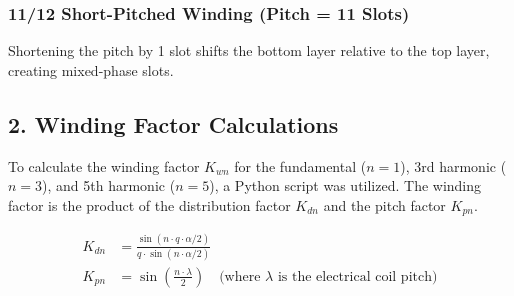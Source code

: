 \documentclass{article}
\begin{document}
\subsubsection*{11/12 Short-Pitched Winding (Pitch = 11 Slots)}
Shortening the pitch by 1 slot shifts the bottom layer relative to the top layer, creating mixed-phase slots.

\vspace{0.3cm}
\noindent
{}

\subsection*{2. Winding Factor Calculations}

To calculate the winding factor $K_{wn}$ for the fundamental ($n=1$), 3rd harmonic ($n=3$), and 5th harmonic ($n=5$), a Python script was utilized. The winding factor is the product of the distribution factor $K_{dn}$ and the pitch factor $K_{pn}$.

\begin{align*}
    K_{dn} &= \frac{\sin(n \cdot q \cdot \alpha / 2)}{q \cdot \sin(n \cdot \alpha / 2)} \\
    K_{pn} &= \sin\left(\frac{n \cdot \lambda}{2}\right) \quad \text{(where $\lambda$ is the electrical coil pitch)}
\end{align*}
\end{document}
